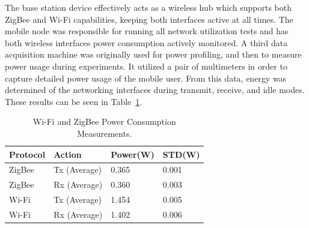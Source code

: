 \documentclass[conference]{IEEEtran}
\begin{document}
The base station device effectively acts as a wireless hub which
supports both ZigBee and Wi-Fi capabilities, keeping both interfaces
active at all times.  The mobile node was responsible for running
all network utilization tests and has both wireless interfaces power
consumption actively monitored. A third data acquisition machine was
originally used for power profiling, and then to measure power usage
during experiments.  It utilized a pair of multimeters in order to
capture detailed power usage of the mobile user.  From this data,
energy was determined of the networking interfaces during transmit,
receive, and idle modes.  These results can be seen in
Table~\ref{t:table2}. \setcounter{table}{2}
\begin{table}[b]
\caption{Wi-Fi and ZigBee Power Consumption Measurements.}
\begin{center}
\begin{tabular}{llll}
\hline
Protocol & Action & Power(W) & STD(W)\\
\hline
ZigBee & Tx (Average) & 0.365 & 0.001\\
ZigBee & Rx (Average) & 0.360 & 0.003\\
Wi-Fi & Tx (Average) & 1.454 & 0.005\\
Wi-Fi & Rx (Average) & 1.402 & 0.006 \\
\hline
\end{tabular}
\end{center}
\label{t:table2}
\end{table}
\end{document}
